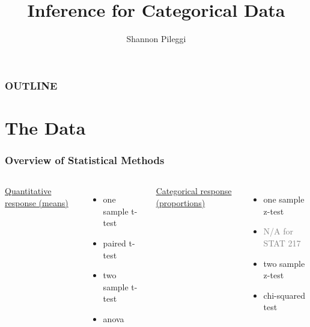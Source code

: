 





\title[Unit 3 Deck 2]{Inference for Categorical Data}
\author[Pileggi]{Shannon Pileggi}


\date{}




\begin{frame}
\titlepage
\end{frame}

\begin{frame}
\frametitle{OUTLINE\qquad\qquad\qquad} \tableofcontents[hideallsubsections]
\end{frame}


\section[The Data]{The Data}
\begin{frame}
\frametitle{Overview of Statistical Methods}
\begin{columns}
\underline{Quantitative response (means)}
\begin{itemize}
    \item
    one sample t-test
    \item
    paired t-test
    \item
    two sample t-test
    \item
    anova
\end{itemize}
\underline{Categorical response (proportions)}
\begin{itemize}
    \item
    one sample z-test
    \item
    \textcolor{gray}{N/A for STAT 217}
    \item
    two sample z-test
    \item
    chi-squared test
\end{itemize}
\end{columns}
\end{frame}

